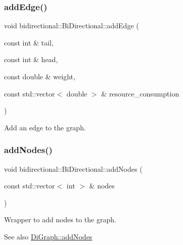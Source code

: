 \subsubsection{\texorpdfstring{add\+Edge()}{addEdge()}}
{\footnotesize\ttfamily void bidirectional\+::\+Bi\+Directional\+::add\+Edge (\begin{DoxyParamCaption}\item[{const int \&}]{tail,  }\item[{const int \&}]{head,  }\item[{const double \&}]{weight,  }\item[{const std\+::vector$<$ double $>$ \&}]{resource\+\_\+consumption }\end{DoxyParamCaption})\hspace{0.3cm}{\ttfamily [inline]}}



Add an edge to the graph. 

\mbox{\label{classbidirectional_1_1BiDirectional_a37633f0f701bfb6a5f3a212212316f29}} 
\subsubsection{\texorpdfstring{add\+Nodes()}{addNodes()}}
{\footnotesize\ttfamily void bidirectional\+::\+Bi\+Directional\+::add\+Nodes (\begin{DoxyParamCaption}\item[{const std\+::vector$<$ int $>$ \&}]{nodes }\end{DoxyParamCaption})\hspace{0.3cm}{\ttfamily [inline]}}



Wrapper to add nodes to the graph. 

\begin{DoxySeeAlso}{See also}
\hyperlink{classbidirectional_1_1DiGraph_a483c50e9b5b483472ae7ee2910f3bcda}{Di\+Graph\+::add\+Nodes} 
\end{DoxySeeAlso}
\mbox{\label{classbidirectional_1_1BiDirectional_ad57667c8edeafda55eba523d02ff33e6}} 
